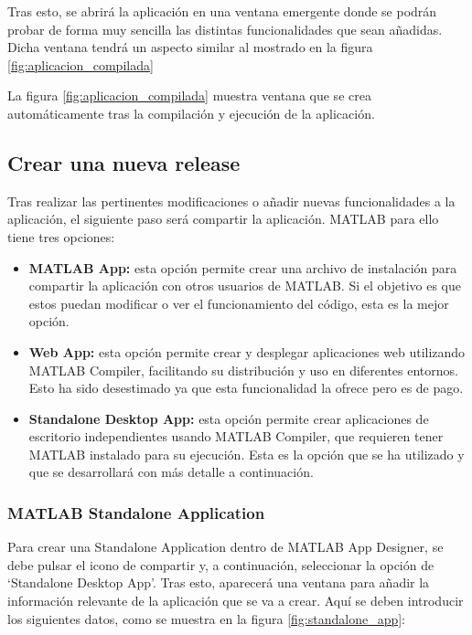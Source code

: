 Tras esto, se abrirá la aplicación en una ventana emergente donde se podrán probar de forma muy sencilla las distintas funcionalidades que sean añadidas. Dicha ventana tendrá un aspecto similar al mostrado en la figura \ref{fig:aplicacion_compilada}


La figura \ref{fig:aplicacion_compilada} muestra ventana que se crea automáticamente tras la compilación y ejecución de la aplicación.

\subsection{Crear una nueva release}\label{crear-una-nueva-release}

Tras realizar las pertinentes modificaciones o añadir nuevas funcionalidades a la aplicación, el siguiente paso será compartir la aplicación. MATLAB para ello tiene tres opciones:

\begin{itemize}
    \item \textbf{MATLAB App:} esta opción permite crear una archivo de instalación para compartir la aplicación con otros usuarios de MATLAB. Si el objetivo es que estos puedan modificar o ver el funcionamiento del código, esta es la mejor opción.
    \item \textbf{Web App:} esta opción permite crear y desplegar aplicaciones web utilizando MATLAB Compiler, facilitando su distribución y uso en diferentes entornos. Esto ha sido desestimado ya que esta funcionalidad la ofrece pero es de pago.
    \item \textbf{Standalone Desktop App:} esta opción permite crear aplicaciones de escritorio independientes usando MATLAB Compiler, que requieren tener MATLAB instalado para su ejecución. Esta es la opción que se ha utilizado y que se desarrollará con más detalle a continuación.
\end{itemize}

\subsubsection{MATLAB Standalone Application}\label{matlab-standalone-application}

Para crear una Standalone Application dentro de MATLAB App Designer, se debe pulsar el icono de compartir y, a continuación, seleccionar la opción de `Standalone Desktop App'. Tras esto, aparecerá una ventana para añadir la información relevante de la aplicación que se va a crear. Aquí se deben introducir los siguientes datos, como se muestra en la figura \ref{fig:standalone_app}:

